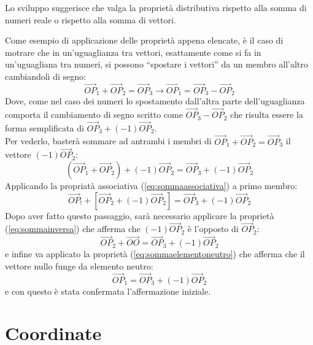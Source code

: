 Lo sviluppo suggerisce che valga la proprietà distributiva rispetto alla somma di numeri reale o rispetto alla somma di vettori.
\begin{oss}
  \label{oss:vettgeo1}
  Come esempio di applicazione delle proprietà appena elencate, è il caso di motrare che in un'uguaglianza tra vettori, esattamente come si fa in un'uguagliana tra numeri, si possono ``spostare i vettori'' da un membro all'altro cambiandoli di segno:
  \begin{equation*}
    \vec{OP}_1+\vec{OP}_2=\vec{OP}_3 \to \vec{OP}_1=\vec{OP}_3-\vec{OP}_2
  \end{equation*}
  Dove, come nel caso dei numeri lo spostamento dall'altra parte dell'uguaglianza comporta il cambiamento di segno scritto come $\vec{OP}_3-\vec{OP}_2$ che risulta essere la forma semplificata di $\vec{OP}_3+(-1)\vec{OP}_2$.\\
  Per vederlo, basterà sommare ad antrambi i membri di $\vec{OP}_1+\vec{OP}_2=\vec{OP}_3$ il vettore $(-1)\vec{OP}_2$:
  \begin{equation*}
    (\vec{OP}_1+\vec{OP}_2)+(-1)\vec{OP}_2=\vec{OP}_3+(-1)\vec{OP}_2
  \end{equation*}
  Applicando la propriatà associativa (\ref{eq:sommaassociativa}) a primo membro:
  \begin{equation*}
    \vec{OP}_!+\left[\vec{OP}_2+(-1)\vec{OP}_2\right]=\vec{OP}_3+(-1)\vec{OP}_2
  \end{equation*}
  Dopo aver fatto questo passaggio, sarà necessario applicare la proprietà (\ref{eq:sommainversa}) che afferma che $(-1)\vec{OP}_2$ è l'opposto di $\vec{OP}_2$:
  \begin{equation*}
    \vec{OP}_2+\vec{OO}=\vec{OP}_3+(-1)\vec{OP}_2
  \end{equation*}
  e infine va applicato la proprietà (\ref{eq:sommaelementoneutro}) che afferma che il vettore nullo funge da elemento neutro:
  \begin{equation*}
    \vec{OP}_1=\vec{OP}_3+(-1)\vec{OP}_2
  \end{equation*}
  e con questo è stata confermata l'affermazione iniziale.
\end{oss}

\section{Coordinate}
\label{sec:coordinate}

